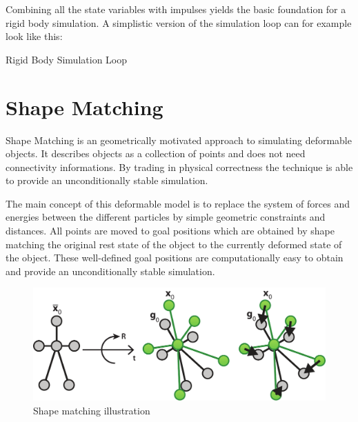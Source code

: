 Combining all the state variables with impulses yields the basic foundation for a rigid body simulation. A simplistic version of the simulation loop can for example look like this:

\begin{algorithm}[h!]
\caption{Rigid Body Simulation Loop}
\begin{algorithmic}[1]
\ENDFOR
{}
	\ENDFOR
\ENDFOR
{}
\ENDFOR
{}
\ENDFOR
\end{algorithmic}
\end{algorithm}

\section{Shape Matching}
\label{sec:shape_matching}

Shape Matching is an geometrically motivated approach to simulating deformable objects. It describes objects as a collection of points and does not need connectivity informations. By trading in physical correctness the technique is able to provide an unconditionally stable simulation. 

The main concept of this deformable model is to replace the system of forces and energies between the different particles by simple geometric constraints and distances. All points are moved to goal positions which are obtained by shape matching the original rest state of the object to the currently deformed state of the object. These well-defined goal positions are computationally easy to obtain and provide an unconditionally stable simulation.

\begin{figure}[h]
\centering
\includegraphics[width=.96\textwidth]{images/shape_matching.pdf}
\caption{Shape matching illustration}
\label{img:shape_matching}
\end{figure}

